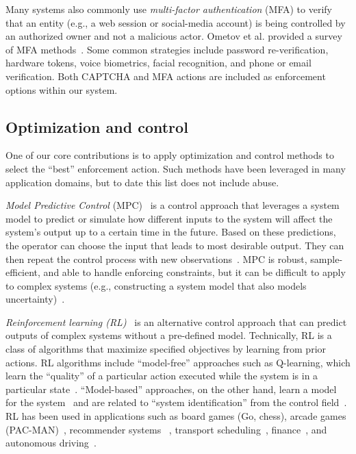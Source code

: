 Many systems also commonly use {\em multi-factor authentication} (MFA) to verify that an entity (e.g., a web session or social-media account) is being controlled by an authorized owner and not a malicious actor. Ometov et al. provided a survey of MFA methods~\cite{mfa}. Some common strategies include password re-verification, hardware tokens, voice biometrics, facial recognition, and phone or email verification. Both CAPTCHA and MFA actions are included as enforcement options within our system.

\subsection{Optimization and control}

One of our core contributions is to apply optimization and control methods to select the ``best'' enforcement action. Such methods have been leveraged in many application domains, but to date this list does not include \osn abuse.

{\em Model Predictive Control} (MPC)~\cite{arroyo2022reinforced,hewing2020learning} is a control approach that leverages a system model to predict or simulate how different inputs to the system will affect the system's output up to a certain time in the future. Based on these predictions, the operator can choose the  input that leads to most desirable output. They can then repeat the control process with new observations~\cite{holkar2010overview,hewing2020learning,recht2019tour}. MPC is robust, sample-efficient, and able to handle enforcing constraints, but it can be difficult to apply to complex systems (e.g., constructing a system model that also models uncertainty)~\cite{arroyo2022reinforced}. 

{\em Reinforcement learning (RL)}~\cite{sutton2018reinforcement} is an alternative control approach that can predict outputs of complex systems without a pre-defined model. Technically, RL is a class of algorithms that maximize specified objectives by learning from prior actions. RL algorithms include ``model-free'' approaches such as Q-learning, which learn the ``quality'' of a particular action executed while the system is in a particular state~\cite{watkins1992q,mnih2015human,kalweit2020deep}. ``Model-based'' approaches, on the other hand, learn a model for the system~\cite{sutton2018reinforcement,recht2019tour} and are related to ``system identification'' from the control field~\cite{Ljung99,recht2019tour}. RL has been used in applications such as board games (Go, chess), arcade games (PAC-MAN)~\cite{jansen2020safe, silver2018general}, recommender systems ~\cite{chow2017risk, zhao2021dear}, transport scheduling~\cite{basso2022dynamic, chinchali2018cellular, singh2020hierarchical, li2019constrained}, finance~\cite{abe2010optimizing, krokhmal2002portfolio}, and autonomous driving~\cite{gu2022constrained, isele2018safe, krasowski2020safe, kalweit2020deep}.

